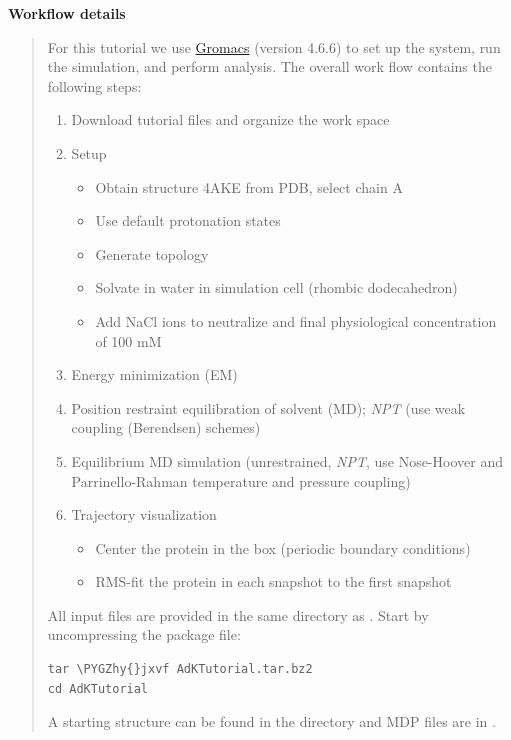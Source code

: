 \documentclass[letterpaper,10pt,english]{sphinxmanual}
\def\PYGZhy{\char`\-}
\begin{document}
\textbf{Workflow details}
\begin{quote}

For this tutorial we use \href{http://www.gromacs.org}{Gromacs} (version 4.6.6) to set up the
system, run the simulation, and perform analysis. The overall work flow
contains the following steps:
\begin{enumerate}
\item {} 
Download tutorial files and organize the work space

\item {} 
Setup
\begin{itemize}
\item {} 
Obtain structure 4AKE from PDB, select chain A

\item {} 
Use default protonation states

\item {} 
Generate topology

\item {} 
Solvate in water in simulation cell (rhombic dodecahedron)

\item {} 
Add NaCl ions to neutralize and final physiological concentration
of 100 mM

\end{itemize}

\item {} 
Energy minimization (EM)

\item {} 
Position restraint equilibration of solvent (MD); \emph{NPT} (use weak
coupling (Berendsen) schemes)

\item {} 
Equilibrium MD simulation (unrestrained, \emph{NPT}, use Nose-Hoover and
Parrinello-Rahman temperature and pressure coupling)

\item {} 
Trajectory visualization
\begin{itemize}
\item {} 
Center the protein in the box (periodic boundary conditions)

\item {} 
RMS-fit the protein in each snapshot to the first snapshot

\end{itemize}

\end{enumerate}

All input files are provided in the same directory as . Start by uncompressing the package file:

\begin{Verbatim}[commandchars=\\\{\}]
tar \PYGZhy{}jxvf AdKTutorial.tar.bz2
cd AdKTutorial
\end{Verbatim}

A starting structure can be found in the 
directory and MDP files are in .
\end{quote}
\end{document}
